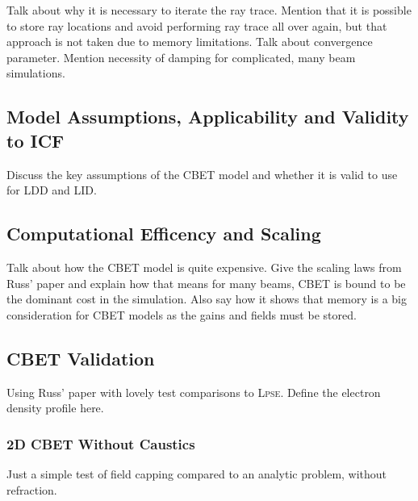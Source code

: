 Talk about why it is necessary to iterate the ray trace.
Mention that it is possible to store ray locations and avoid performing ray trace all over again, but that approach is not taken due to memory limitations.
Talk about convergence parameter.
Mention necessity of damping for complicated, many beam simulations.

\subsection{Model Assumptions, Applicability and Validity to ICF}
\label{sec:model_appliciability}

Discuss the key assumptions of the CBET model and whether it is valid to use for LDD and LID.

\subsection{Computational Efficency and Scaling}

Talk about how the CBET model is quite expensive.
Give the scaling laws from Russ' paper and explain how that means for many beams, CBET is bound to be the dominant cost in the simulation.
Also say how it shows that memory is a big consideration for CBET models as the gains and fields must be stored.

\subsection{\ac{CBET} Validation}
Using Russ' paper with lovely test comparisons to \textsc{Lpse}.
Define the electron density profile here.

\subsubsection{2D \ac{CBET} Without Caustics}
Just a simple test of field capping compared to an analytic problem, without refraction.

